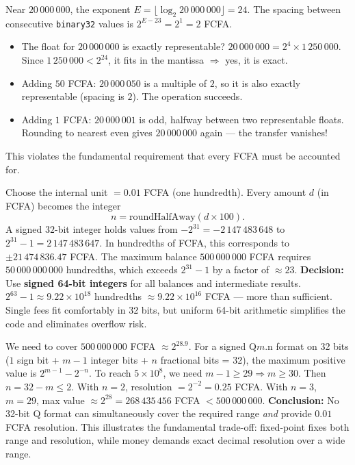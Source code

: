 \documentclass[11pt]{article}
\newcounter{popsec}
\newcounter{popsub}
\newcommand{\courssub}[1]{%
  \stepcounter{popsub}%
  \par\vspace{9pt}\noindent{\popxbold\fontsize{11.5}{13}\selectfont\color{popink}{\color{poporange}\thepopsec.\thepopsub}\hspace{6pt}#1}\par\nopagebreak\vspace{4pt}
}
\begin{document}
\begin{exemplebox}
Near $20\,000\,000$, the exponent $E = \lfloor \log_2 20\,000\,000 \rfloor = 24$. The spacing between consecutive \texttt{binary32} values is $2^{E-23} = 2^{1} = 2$ FCFA.
\begin{itemize}
\item The float for $20\,000\,000$ is exactly representable? $20\,000\,000 = 2^4 \times 1\,250\,000$. Since $1\,250\,000 < 2^{24}$, it fits in the mantissa $\Rightarrow$ yes, it is exact.
\item Adding $50$ FCFA: $20\,000\,050$ is a multiple of $2$, so it is also exactly representable (spacing is $2$). The operation succeeds.
\item Adding $1$ FCFA: $20\,000\,001$ is odd, halfway between two representable floats. Rounding to nearest even gives $20\,000\,000$ again — the transfer vanishes!
\end{itemize}
This violates the fundamental requirement that every FCFA must be accounted for.
\end{exemplebox}

\courssub{Task 2 — Representation Choice}

\begin{exemplebox}
Choose the internal unit $= 0.01$ FCFA (one hundredth). Every amount $d$ (in FCFA) becomes the integer
\[
n = \mathrm{roundHalfAway}(d \times 100).
\]
A signed $32$-bit integer holds values from $-2^{31} = -2\,147\,483\,648$ to $2^{31}-1 = 2\,147\,483\,647$.
In hundredths of FCFA, this corresponds to $\pm 21\,474\,836.47$ FCFA.
The maximum balance $500\,000\,000$ FCFA requires $50\,000\,000\,000$ hundredths, which exceeds $2^{31}-1$ by a factor of $\approx 23$.
\textbf{Decision:} Use \textbf{signed 64-bit integers} for all balances and intermediate results. $2^{63}-1 \approx 9.22 \times 10^{18}$ hundredths $\approx 9.22 \times 10^{16}$ FCFA — more than sufficient. Single fees fit comfortably in 32 bits, but uniform 64-bit arithmetic simplifies the code and eliminates overflow risk.
\end{exemplebox}

\begin{exemplebox}
We need to cover $500\,000\,000$ FCFA $\approx 2^{28.9}$. For a signed Q$m$.n format on 32 bits ($1$ sign bit + $m-1$ integer bits + $n$ fractional bits = 32), the maximum positive value is $2^{m-1} - 2^{-n}$.
To reach $5 \times 10^8$, we need $m-1 \ge 29 \Rightarrow m \ge 30$. Then $n = 32 - m \le 2$.
With $n=2$, resolution $= 2^{-2} = 0.25$ FCFA. With $n=3$, $m=29$, max value $\approx 2^{28} = 268\,435\,456$ FCFA $< 500\,000\,000$.
\textbf{Conclusion:} No 32-bit Q format can simultaneously cover the required range \emph{and} provide $0.01$ FCFA resolution. This illustrates the fundamental trade-off: fixed-point fixes both range and resolution, while money demands exact decimal resolution over a wide range.
\end{exemplebox}
\end{document}
